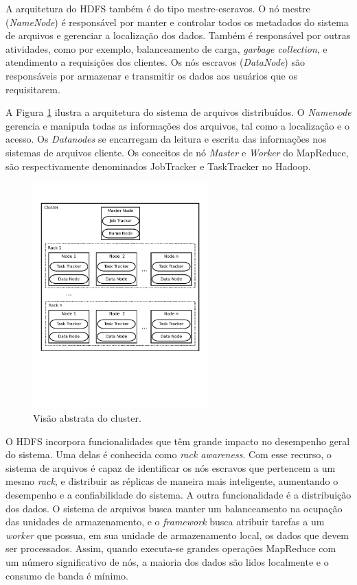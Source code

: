 A arquitetura do HDFS também é do tipo mestre-escravos.
O nó mestre (\textit{NameNode}) é responsável por manter e controlar todos os metadados do sistema de arquivos e gerenciar a localização dos dados. Também é responsável por outras atividades, como por exemplo, balanceamento de carga, \textit{garbage collection}, e atendimento a requisições dos clientes.
Os nós escravos (\textit{DataNode}) são responsáveis por armazenar e transmitir os dados aos usuários que os requisitarem.

A Figura \ref{fig:hdfs} ilustra a arquitetura do sistema de arquivos distribuídos.
O \textit{Namenode} gerencia e manipula todas as informações dos arquivos, tal como a localização e o acesso. Os \textit{Datanodes} se encarregam da leitura e escrita das informações nos sistemas de arquivos cliente. Os conceitos de nó \textit{Master} e \textit{Worker} do MapReduce, são respectivamente denominados JobTracker e TaskTracker no Hadoop.
\begin{figure}[htb]
\centering
\includegraphics[trim=0cm 6cm 0cm 2cm, width=0.6\textwidth]{figuras/HadoopCluster.pdf}
\caption{Visão abstrata do cluster.}
\label{fig:hdfs}
\end{figure}

O HDFS incorpora funcionalidades que têm grande impacto no desempenho geral do sistema.
Uma delas é conhecida como \textit{rack awareness}. Com esse recurso, o sistema de arquivos é capaz de identificar os nós escravos que pertencem a um mesmo \textit{rack}, e distribuir as réplicas de maneira mais inteligente, aumentando o desempenho e a confiabilidade do sistema.
A outra funcionalidade é a distribuição dos dados. O sistema de arquivos busca manter um balanceamento na ocupação das unidades de armazenamento, e o \textit{framework} busca atribuir tarefas a um \textit{worker} que possua, em sua unidade de armazenamento local, os dados que devem ser processados.
Assim, quando executa-se grandes operações MapReduce com um número significativo de nós, a maioria dos dados são lidos localmente e o consumo de banda é mínimo.





